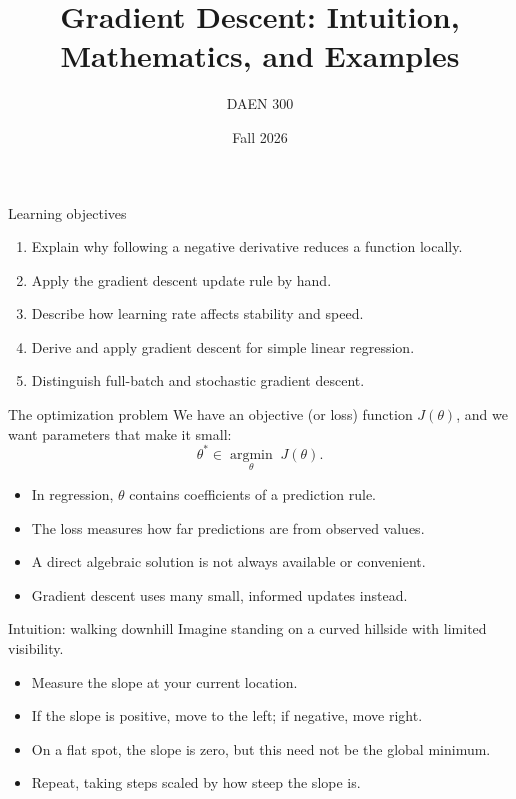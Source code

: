 \documentclass[aspectratio=169,11pt]{beamer}
\title{Gradient Descent: Intuition, Mathematics, and Examples}
\author{DAEN 300}
\date{Fall 2026}
\begin{document}
\begin{frame}
\titlepage
\end{frame}

\begin{frame}{Learning objectives}
\begin{enumerate}
\item Explain why following a negative derivative reduces a function locally.
\item Apply the gradient descent update rule by hand.
\item Describe how learning rate affects stability and speed.
\item Derive and apply gradient descent for simple linear regression.
\item Distinguish full-batch and stochastic gradient descent.
\end{enumerate}
\end{frame}

\begin{frame}{The optimization problem}
We have an objective (or loss) function $J(\theta)$, and we want parameters that make it small:
\[
\theta^* \in \underset{\theta}{\operatorname{argmin}}\; J(\theta).
\]
\begin{itemize}
\item In regression, $\theta$ contains coefficients of a prediction rule.
\item The loss measures how far predictions are from observed values.
\item A direct algebraic solution is not always available or convenient.
\item Gradient descent uses many small, informed updates instead.
\end{itemize}
\end{frame}

\begin{frame}{Intuition: walking downhill}
Imagine standing on a curved hillside with limited visibility.
\begin{itemize}
\item Measure the slope at your current location.
\item If the slope is positive, move to the left; if negative, move right.
\item On a flat spot, the slope is zero, but this need not be the global minimum.
\item Repeat, taking steps scaled by how steep the slope is.
\end{itemize}
\begin{center}
\end{center}
\end{frame}
\end{document}
